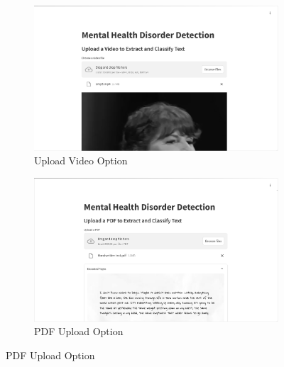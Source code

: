 \begin{figure}[H]
    \begin{subfigure}[b]{0.495\textwidth}
        \centering
        \includegraphics[width=\textwidth]{App Images/12 Interface.png}
        \caption{Upload Video Option}
        \label{fig:06i4}
    \end{subfigure}
    \hfill
    \begin{subfigure}[b]{0.495\textwidth}
        \centering
        \includegraphics[width=\textwidth]{App Images/20 Interface.png}
        \caption{PDF Upload Option}
        \label{fig:10i23445}
    \end{subfigure}

    \vspace{1em}


\end{figure}

